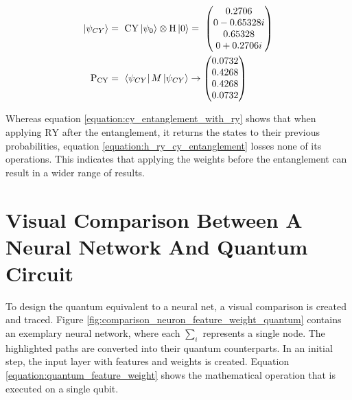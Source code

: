 \begin{equation}
    \centering
    \begin{split}
    \ket{\psi_{CY}} &=\ \mathrm{CY}\ket{\psi_0}\otimes\mathrm{H}\ket{0} =\ \begin{pmatrix}
     0.2706\\
     0-0.65328i\\
     0.65328\\
     0+0.2706i\\
     \end{pmatrix} \\
    \mathrm{P_{CY}} &=\ \bra{\psi_{CY}}M\ket{\psi_{CY}} \rightarrow \begin{pmatrix}
    0.0732\\
    0.4268\\
    0.4268\\
    0.0732\\
     \end{pmatrix}
    \end{split}
    \label{equation:h_ry_cy_entanglement}
\end{equation}

Whereas equation \ref{equation:cy_entanglement_with_ry} shows that when applying $\mathrm{RY}$ after the entanglement, it returns the states to their previous probabilities,  equation \ref{equation:h_ry_cy_entanglement} losses none of its operations. This indicates that applying the weights before the entanglement can result in a wider range of results.

\clearpage
\section{Visual Comparison Between A Neural Network And Quantum Circuit}

To design the quantum equivalent to a neural net, a visual comparison is created and traced. Figure \ref{fig:comparison_neuron_feature_weight_quantum} contains an exemplary neural network, where each $\sum_i$ represents a single node. The highlighted paths are converted into their quantum counterparts. In an initial step, the input layer with features and weights is created. Equation \ref{equation:quantum_feature_weight} shows the mathematical operation that is executed on a single qubit.

